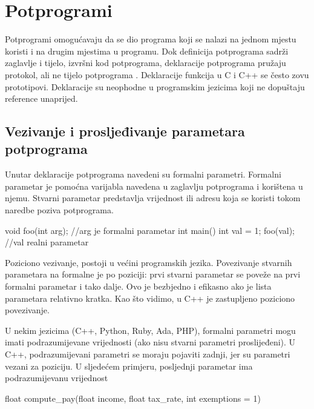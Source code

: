 \documentclass[11pt]{book}
\begin{document}

\section{Potprogrami}

Potprogrami omogućavaju da se dio programa koji se nalazi na jednom mjestu koristi i na drugim mjestima u programu.  Dok definicija potprograma sadrži zaglavlje i tijelo, izvršni kod potprograma, deklaracije potprograma pružaju protokol, ali ne tijelo potprograma . Deklaracije funkcija u C i C++ se često zovu prototipovi. Deklaracije su neophodne u programskim jezicima koji ne dopuštaju reference unaprijed.

\subsection{Vezivanje i prosljeđivanje parametara potprograma}

Unutar deklaracije potprograma navedeni su formalni parametri. Formalni parametar je pomoćna varijabla navedena u zaglavlju potprograma i korištena u njemu. Stvarni parametar predstavlja vrijednost ili adresu koja se koristi tokom naredbe poziva potprograma.

\begin{shortlisting}
  void foo(int arg); //arg je formalni parametar
  int main()
    {
      int val = 1;
      foo(val);  //val realni parametar
    }
\end{shortlisting}

Poziciono vezivanje, postoji u većini programskih jezika. Povezivanje stvarnih parametara na formalne je po poziciji: prvi stvarni parametar se poveže na prvi formalni parametar i tako dalje. Ovo je bezbjedno i efikasno ako je lista parametara relativno kratka. Kao što vidimo, u C++ je zastupljeno poziciono povezivanje.

U  nekim  jezicima  (C++,  Python,  Ruby,  Ada,  PHP),  formalni  parametri  mogu  imati podrazumijevane vrijednosti (ako nisu stvarni parametri proslijeđeni). U C++, podrazumijevani parametri se moraju pojaviti zadnji, jer su parametri vezani za poziciju. U sljedećem primjeru, posljednji parametar ima podrazumijevanu vrijednost

\begin{shortlisting}
  float compute_pay(float income, float tax_rate, int exemptions = 1)
\end{shortlisting}
\end{document}
